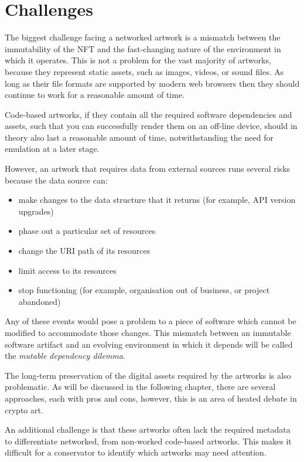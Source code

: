 \section{Challenges}
\label{sec:challenges}

The biggest challenge facing a networked artwork is a mismatch between the immutability of the NFT and the fast-changing nature of the environment in which it operates. This is not a problem for the vast majority of artworks, because they represent static assets, such as images, videos, or sound files. As long as their file formats are supported by modern web browsers then they should continue to work for a reasonable amount of time.

Code-based artworks, if they contain all the required software dependencies and assets, such that you can successfully render them on an off-line device, should in theory also last a reasonable amount of time, notwithstanding the need for emulation at a later stage.

However, an artwork that requires data from external sources runs several risks because the data source can:

\begin{itemize}
    \item make changes to the data structure that it returns (for example, API version upgrades)
    \item phase out a particular set of resources
    \item change the URI path of its resources
    \item limit access to its resources
    \item stop functioning (for example, organisation out of business, or project abandoned)
\end{itemize}

Any of these events would pose a problem to a piece of software which cannot be modified to accommodate those changes. This mismatch between an immutable software artifact and an evolving environment in which it depends will be called the \emph{mutable dependency dilemma}.

The long-term preservation of the digital assets required by the artworks is also problematic. As will be discussed in the following chapter, there are several approaches, each with pros and cons, however, this is an area of heated debate in crypto art.

An additional challenge is that these artworks often lack the required metadata to differentiate networked, from non-worked code-based artworks. This makes it difficult for a conservator to identify which artworks may need attention.

